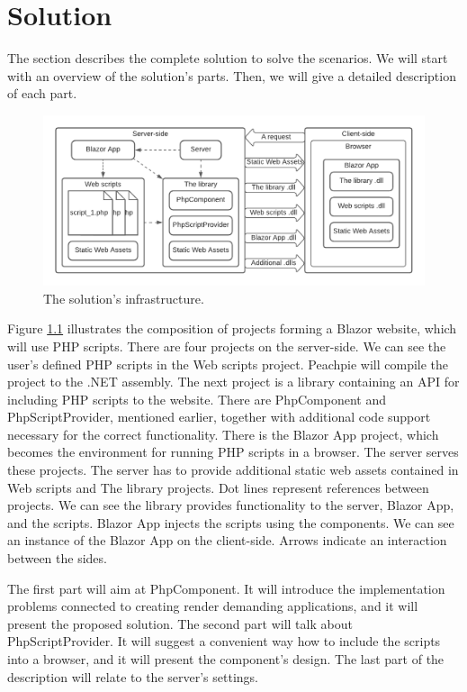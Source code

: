 \chapter{Solution}
The section describes the complete solution to solve the scenarios.
We will start with an overview of the solution's parts.
Then, we will give a detailed description of each part.
\par
\begin{figure}[H]\centering
\includegraphics[scale=0.7]{./img/SolutionInfrastructure}
\caption{The solution's infrastructure.}
\label{img03:infrastructure}
\end{figure} 
\par
Figure \ref{img03:infrastructure} illustrates the composition of projects forming a Blazor website, which will use PHP scripts.
There are four projects on the server-side.
We can see the user's defined PHP scripts in the Web scripts project.
Peachpie will compile the project to the .NET assembly.
The next project is a library containing an API for including PHP scripts to the website.
There are PhpComponent and PhpScriptProvider, mentioned earlier, together with additional code support necessary for the correct functionality.
There is the Blazor App project, which becomes the environment for running PHP scripts in a browser.
The server serves these projects.
The server has to provide additional static web assets contained in Web scripts and The library projects.
Dot lines represent references between projects.
We can see the library provides functionality to the server, Blazor App, and the scripts.
Blazor App injects the scripts using the components.
We can see an instance of the Blazor App on the client-side.
Arrows indicate an interaction between the sides. 
\par
The first part will aim at PhpComponent.
It will introduce the implementation problems connected to creating render demanding applications, and it will present the proposed solution.
The second part will talk about PhpScriptProvider.
It will suggest a convenient way how to include the scripts into a browser, and it will present the component's design.
The last part of the description will relate to the server's settings.

